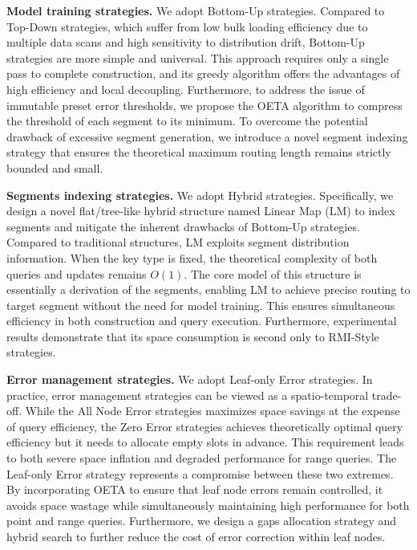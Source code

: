 \textbf{Model training strategies.} We adopt Bottom-Up strategies. Compared to Top-Down strategies, which suffer from low bulk loading efficiency due to multiple data scans and high sensitivity to distribution drift, Bottom-Up strategies are more simple and universal. This approach requires only a single pass to complete construction, and its greedy algorithm offers the advantages of high efficiency and local decoupling. Furthermore, to address the issue of immutable preset error thresholds, we propose the OETA algorithm to compress the threshold of each segment to its minimum. To overcome the potential drawback of excessive segment generation, we introduce a novel segment indexing strategy that ensures the theoretical maximum routing length remains strictly bounded and small.

\textbf{Segments indexing strategies.} We adopt Hybrid strategies. Specifically, we design a novel flat/tree-like hybrid structure named Linear Map (LM) to index segments and mitigate the inherent drawbacks of Bottom-Up strategies. Compared to traditional structures, LM exploits segment distribution information. When the key type is fixed, the theoretical complexity of both queries and updates remains $O(1)$. The core model of this structure is essentially a derivation of the segments, enabling LM to achieve precise routing to target segment without the need for model training. This ensures simultaneous efficiency in both construction and query execution. Furthermore, experimental results demonstrate that its space consumption is second only to RMI-Style strategies.

\textbf{Error management strategies.} We adopt Leaf-only Error strategies. In practice, error management strategies can be viewed as a spatio-temporal trade-off. While the All Node Error strategies maximizes space savings at the expense of query efficiency, the Zero Error strategies achieves theoretically optimal query efficiency but it needs to allocate empty slots in advance. This requirement leads to both severe space inflation and degraded performance for range queries. The Leaf-only Error strategy represents a compromise between these two extremes. By incorporating OETA to ensure that leaf node errors remain controlled, it avoids space wastage while simultaneously maintaining high performance for both point and range queries. Furthermore, we design a gaps allocation strategy and hybrid search to further reduce the cost of error correction within leaf nodes.



